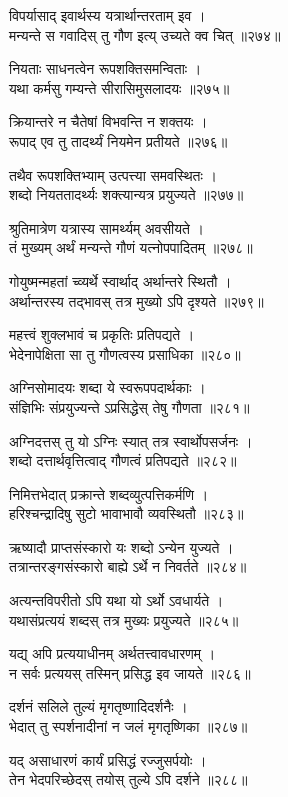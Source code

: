 विपर्यासाद् इवार्थस्य यत्रार्थान्तरताम् इव ।\\मन्यन्ते स गवादिस् तु गौण इत्य् उच्यते क्व चित् ॥२७४॥

नियताः साधनत्वेन रूपशक्तिसमन्विताः ।\\यथा कर्मसु गम्यन्ते सीरासिमुसलादयः ॥२७५॥

क्रियान्तरे न चैतेषां विभवन्ति न शक्तयः ।\\रूपाद् एव तु तादर्थ्यं नियमेन प्रतीयते ॥२७६॥

तथैव रूपशक्तिभ्याम् उत्पत्त्या समवस्थितः ।\\शब्दो नियततादर्थ्यः शक्त्यान्यत्र प्रयुज्यते ॥२७७॥

श्रुतिमात्रेण यत्रास्य सामर्थ्यम् अवसीयते ।\\तं मुख्यम् अर्थं मन्यन्ते गौणं यत्नोपपादितम् ॥२७८॥

गोयुष्मन्महतां च्व्यर्थे स्वार्थाद् अर्थान्तरे स्थितौ ।\\अर्थान्तरस्य तद्भावस् तत्र मुख्यो ऽपि दृश्यते ॥२७९॥

महत्त्वं शुक्लभावं च प्रकृतिः प्रतिपद्यते ।\\भेदेनापेक्षिता सा तु गौणत्वस्य प्रसाधिका ॥२८०॥

अग्निसोमादयः शब्दा ये स्वरूपपदार्थकाः ।\\संज्ञिभिः संप्रयुज्यन्ते ऽप्रसिद्धेस् तेषु गौणता ॥२८१॥

अग्निदत्तस् तु यो ऽग्निः स्यात् तत्र स्वार्थोपसर्जनः ।\\शब्दो दत्तार्थवृत्तित्वाद् गौणत्वं प्रतिपद्यते ॥२८२॥

निमित्तभेदात् प्रक्रान्ते शब्दव्युत्पत्तिकर्मणि ।\\हरिश्चन्द्रादिषु सुटो भावाभावौ व्यवस्थितौ ॥२८३॥

ऋष्यादौ प्राप्तसंस्कारो यः शब्दो ऽन्येन युज्यते ।\\तत्रान्तरङ्गसंस्कारो बाह्ये ऽर्थे न निवर्तते ॥२८४॥

अत्यन्तविपरीतो ऽपि यथा यो ऽर्थो ऽवधार्यते ।\\यथासंप्रत्ययं शब्दस् तत्र मुख्यः प्रयुज्यते ॥२८५॥

यद्य् अपि प्रत्ययाधीनम् अर्थतत्त्वावधारणम् ।\\न सर्वः प्रत्ययस् तस्मिन् प्रसिद्ध इव जायते ॥२८६॥

दर्शनं सलिले तुल्यं मृगतृष्णादिदर्शनैः ।\\भेदात् तु स्पर्शनादीनां न जलं मृगतृष्णिका ॥२८७॥

यद् असाधारणं कार्यं प्रसिद्धं रज्जुसर्पयोः ।\\तेन भेदपरिच्छेदस् तयोस् तुल्ये ऽपि दर्शने ॥२८८॥

